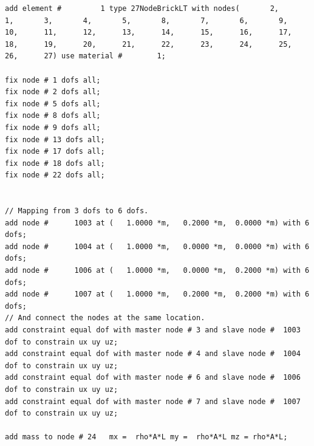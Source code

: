 \begin{lstlisting}
add element #         1 type 27NodeBrickLT with nodes(       2,       1,       3,       4,       5,       8,       7,       6,       9,      10,      11,      12,      13,      14,      15,      16,      17,      18,      19,      20,      21,      22,      23,      24,      25,      26,      27) use material #        1; 

fix node # 1 dofs all;
fix node # 2 dofs all;
fix node # 5 dofs all;
fix node # 8 dofs all;
fix node # 9 dofs all;
fix node # 13 dofs all;
fix node # 17 dofs all;
fix node # 18 dofs all;
fix node # 22 dofs all;


// Mapping from 3 dofs to 6 dofs. 
add node #      1003 at (   1.0000 *m,   0.2000 *m,  0.0000 *m) with 6 dofs;
add node #      1004 at (   1.0000 *m,   0.0000 *m,  0.0000 *m) with 6 dofs;
add node #      1006 at (   1.0000 *m,   0.0000 *m,  0.2000 *m) with 6 dofs;
add node #      1007 at (   1.0000 *m,   0.2000 *m,  0.2000 *m) with 6 dofs;
// And connect the nodes at the same location.
add constraint equal dof with master node # 3 and slave node #  1003 dof to constrain ux uy uz;
add constraint equal dof with master node # 4 and slave node #  1004 dof to constrain ux uy uz;
add constraint equal dof with master node # 6 and slave node #  1006 dof to constrain ux uy uz;
add constraint equal dof with master node # 7 and slave node #  1007 dof to constrain ux uy uz;

add mass to node # 24   mx =  rho*A*L my =  rho*A*L mz = rho*A*L;


\end{lstlisting}
